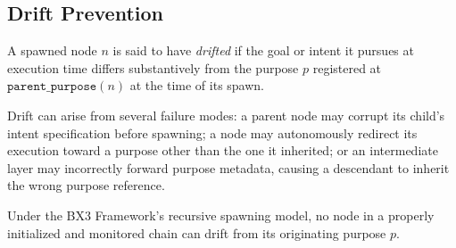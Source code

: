\subsection{Drift Prevention}
\label{sec:drift-prevention}

\begin{definition}[Drift]
A spawned node $n$ is said to have \emph{drifted} if the goal or intent it pursues at execution time differs substantively from the purpose $p$ registered at $\texttt{parent\_purpose}(n)$ at the time of its spawn.
\end{definition}

Drift can arise from several failure modes: a parent node may corrupt its child's intent specification before spawning; a node may autonomously redirect its execution toward a purpose other than the one it inherited; or an intermediate layer may incorrectly forward purpose metadata, causing a descendant to inherit the wrong purpose reference.

\begin{maintheorem}
Under the BX3 Framework's recursive spawning model, no node in a properly initialized and monitored chain can drift from its originating purpose $p$.
\end{maintheorem}


